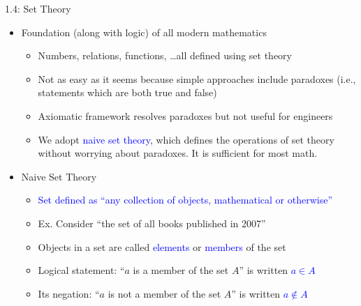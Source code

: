 \documentclass[10pt,english]{beamer}
\begin{document}
\begin{frame}{1.4: Set Theory}

\begin{itemize}
\setlength\itemsep{3mm}
\item<1-> Foundation (along with logic) of all modern mathematics \vspace{1mm}
\begin{itemize} 
  \setlength\itemsep{1.5mm}
  \item Numbers, relations, functions, \ldots all defined using set theory
  \item Not as easy as it seems because simple approaches include paradoxes (i.e., statements which are both true and false)
  \item Axiomatic framework resolves paradoxes but not useful for engineers
  \item We adopt \textcolor{blue}{naive set theory}, which defines the operations of set theory without worrying about paradoxes. It is sufficient for most math.
\end{itemize}

\item<2-> Naive Set Theory \vspace{1mm}
\begin{itemize} 
  \setlength\itemsep{1.5mm}
  \item \textcolor{blue}{Set defined as ``any collection of objects, mathematical or otherwise''}
  \item Ex. Consider ``the set of all books published in 2007''
  \item Objects in a set are called \textcolor{blue}{elements} or \textcolor{blue}{members} of the set
  \item Logical statement: ``$a$ is a member of the set $A$'' is written \textcolor{blue}{$a \in A$}
  \item Its negation: ``$a$ is not a member of the set $A$'' is written \textcolor{blue}{$a \notin A$}
\end{itemize}
\end{itemize}
\end{frame}
\end{document}
